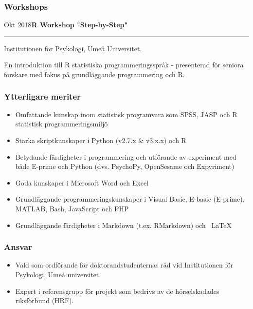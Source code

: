 \documentclass[]{article}
\providecommand{\tightlist}{%
  \setlength{\itemsep}{0pt}\setlength{\parskip}{0pt}}
\begin{document}
\hypertarget{workshops}{%
\subsubsection{Workshops}\label{workshops}}

Okt 2018\hspace{0.75cm}\textbf{R Workshop "Step-by-Step"}\vspace{1mm}

\hrule
\begin{changemargin}{2.15cm}{2.4cm}


Institutionen för Psykologi, Umeå Universitet.

En introduktion till R statistiska programmeringsspråk - presenterad för seniora forskare med fokus på grundläggande programmering och R.

\end{changemargin}

\hypertarget{ytterligare-meriter}{%
\subsubsection{Ytterligare meriter}\label{ytterligare-meriter}}

\begin{itemize}
\tightlist
\item
  Omfattande kunskap inom statistisk programvara som SPSS, JASP och R
  statistisk programmeringsmiljö
\item
  Starka skriptkunskaper i Python (v2.7.x \& v3.x.x) och R
\item
  Betydande färdigheter i programmering och utförande av experiment med
  både E-prime och Python (dvs. PsychoPy, OpenSesame och Expyriment)
\item
  Goda kunskaper i Microsoft Word och Excel
\item
  Grundläggande programmeringskunskaper i Visual Basic, E-basic
  (E-prime), MATLAB, Bash, JavaScript och PHP
\item
  Grundläggande färdigheter i Markdown (t.ex. RMarkdown) och ~LaTeX
\end{itemize}

\hypertarget{ansvar}{%
\subsubsection{Ansvar}\label{ansvar}}

\begin{itemize}
\tightlist
\item
  Vald som ordförande för doktorandstudenternas råd vid Institutionen
  för Psykologi, Umeå universitet.
\item
  Expert i referensgrupp för projekt som bedrivs av de hörselskadades
  riksförbund (HRF).
\end{itemize}
\end{document}
